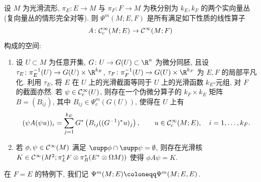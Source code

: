 \begin{definition}[作用在向量丛截面上的伪微分算子]\label{def:5.42}
设 $M$ 为光滑流形, $\pi_E \colon E \to M$ 与 $\pi_F \colon F \to M$ 为秩分别为 $k_E, k_F$ 的两个实向量丛 (复向量丛的情形完全对等). 则 $\Psi^m(M; E, F)$ 是所有满足如下性质的线性算子
\begin{equation}\label{eq:5.97}
    A \colon \mathcal{C}_{\mathrm{c}}^\infty(M; E) \to \mathcal{C}^\infty(M; F)
\end{equation}
构成的空间:
\begin{enumerate}
    \item 设 $U \subset M$ 为任意开集, $G \colon U \to G(U) \subset \R^n$ 为微分同胚, 且设 $\tau_E \colon \pi_E^{-1}(U) \to G(U) \times \R^{k_E}$, $\tau_F \colon \pi_F^{-1}(U) \to G(U) \times \R^{k_F}$ 为 $E, F$ 的局部平凡化. 利用 $\tau_E$, 将 $E$ 在 $U$ 上的光滑截面等同于 $U$ 上的光滑函数 $k_E$-元组, 对 $F$ 的截面亦然. 若 $\psi \in \mathcal{C}_{\mathrm{c}}^\infty(U)$, 则存在一个伪微分算子的 $k_F \times k_E$ 矩阵 $B = (B_{ij})$, 其中 $B_{ij} \in \Psi_{\mathrm{c}}^m(G(U))$, 使得在 $U$ 上有
    \begin{equation}\label{eq:5.98}
        (\psi A(\psi u))_i = \sum_{j=1}^{k_E} G^* \left( B_{ij} ((G^{-1})^* u)_j \right), \qquad u \in \mathcal{C}_{\mathrm{c}}^\infty(M; E), \quad i = 1, \ldots, k_F.
    \end{equation}
    \item 若 $\phi, \psi \in \mathcal{C}^\infty(M)$ 满足 $\supp\phi \cap \supp\psi = \emptyset$, 则存在光滑核 $K \in \mathcal{C}^\infty(M^2; \pi_L^* F \otimes \pi_R^*(E^* \otimes \Omega M))$ 使得 $\phi A \psi = K$.
\end{enumerate}
在 $F = E$ 的特例下, 我们记 $\Psi^m(M; E) \defeq \Psi^m(M; E, E)$.
\end{definition}

